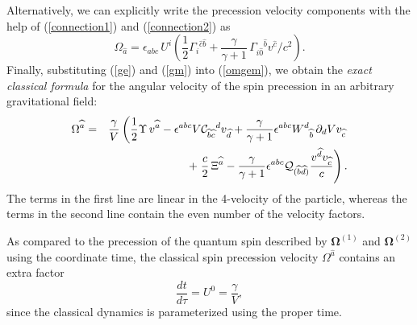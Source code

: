 \documentclass[preprint,showpacs,preprintnumbers,eqsecnum,amsmath,amssymb]{revtex4-1}
\begin{document}
Alternatively, we can explicitly write the precession velocity components
with the help of (\ref{connection1}) and (\ref{connection2}) as \cite{PK,OST} 
\begin{equation}
\Omega_{\widehat{a}} = \epsilon_{abc}\,U^i\left({\frac 12}\Gamma_i{}^{\widehat{c}
\widehat{b}} +{\frac {\gamma}{\gamma + 1}}\,\Gamma_{i\widehat{0}}{}^{\widehat{b}}
v^{\widehat{c}}/c^2\right).\label{OmegaG}
\end{equation} 
Finally, substituting (\ref{ge}) and (\ref{gm}) into (\ref{omgem}), 
we obtain the {\it exact classical formula} for the angular velocity of 
the spin precession in an arbitrary gravitational field:
\begin{eqnarray}
\Omega^{\widehat{a}} &=& {\frac {\gamma}{V}}\left({\frac 12}{\Upsilon}
\,v^{\widehat{a}} - \epsilon^{abc}V{\cal C}_{{\widehat{b}}{\widehat{c}}}{}^d
v_{\widehat{d}} + {\frac \gamma{\gamma + 1}}\epsilon^{abc}W^d{}_{\widehat{b}}
\,\partial_dVv_{\widehat{c}}\right.\nonumber\\
&& +\left.{\frac c2}\,{\Xi}^{\widehat{a}} - {\frac \gamma{\gamma +
1}} \epsilon^{abc}{\cal Q}_{(\widehat{b}\widehat{d})}{\frac
{v^{\widehat{d}} v_{\widehat{c}}} c}\right).\label{OmegaS}
\end{eqnarray}
The terms in the first line are linear in the 4-velocity of the
particle, whereas the terms in the second line contain the even
number of the velocity factors.

As compared to the  precession of the quantum spin described by
$\bm\Omega^{(1)}$ and $\bm\Omega^{(2)}$ using the coordinate time,
the classical spin precession velocity $\Omega^{\widehat{a}}$ contains
an extra factor 
\begin{equation}
{\frac {dt}{d\tau}} = U^0 = {\frac \gamma V},\label{dtdt}
\end{equation}
since the classical dynamics is parameterized using the proper time.
\end{document}
